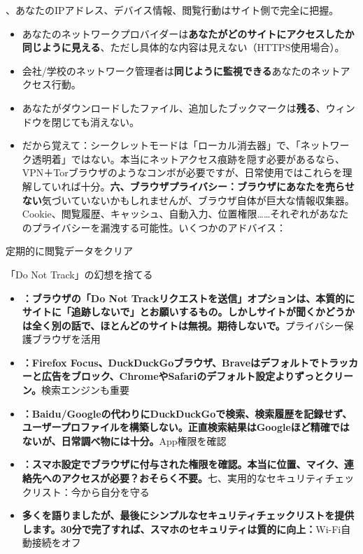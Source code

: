、あなたのIPアドレス、デバイス情報、閲覧行動はサイト側で完全に把握。

\begin{itemize}
  \item あなたのネットワークプロバイダーは\textbf{あなたがどのサイトにアクセスしたか同じように見える}、ただし具体的な内容は見えない（HTTPS使用場合）。
  \item 会社/学校のネットワーク管理者は\textbf{同じように監視できる}あなたのネットアクセス行動。
  \item あなたがダウンロードしたファイル、追加したブックマークは\textbf{残る}、ウィンドウを閉じても消えない。
  \item だから覚えて：シークレットモードは「ローカル消去器」で、「ネットワーク透明着」ではない。本当にネットアクセス痕跡を隠す必要があるなら、VPN＋Torブラウザのようなコンボが必要ですが、日常使用ではこれらを理解していれば十分。\textbf{六、ブラウザプライバシー：ブラウザにあなたを売らせない}気づいていないかもしれませんが、ブラウザ自体が巨大な情報収集器。Cookie、閲覧履歴、キャッシュ、自動入力、位置権限……それぞれがあなたのプライバシーを漏洩する可能性。いくつかのアドバイス：
\end{itemize}

定期的に閲覧データをクリア


「Do Not Track」の幻想を捨てる

\begin{itemize}
  \item \textbf{：ブラウザの「Do Not Trackリクエストを送信」オプションは、本質的にサイトに「追跡しないで」とお願いするもの。しかしサイトが聞くかどうかは全く別の話で、ほとんどのサイトは無視。期待しないで。}プライバシー保護ブラウザを活用
  \item \textbf{：Firefox Focus、DuckDuckGoブラウザ、Braveはデフォルトでトラッカーと広告をブロック、ChromeやSafariのデフォルト設定よりずっとクリーン。}検索エンジンも重要
  \item \textbf{：Baidu/Googleの代わりにDuckDuckGoで検索、検索履歴を記録せず、ユーザープロファイルを構築しない。正直検索結果はGoogleほど精確ではないが、日常調べ物には十分。}App権限を確認
  \item \textbf{：スマホ設定でブラウザに付与された権限を確認。本当に位置、マイク、連絡先へのアクセスが必要？おそらく不要。}七、実用的なセキュリティチェックリスト：今から自分を守る
  \item \textbf{多くを語りましたが、最後にシンプルなセキュリティチェックリストを提供します。30分で完了すれば、スマホのセキュリティは質的に向上：}Wi-Fi自動接続をオフ
\end{itemize}

